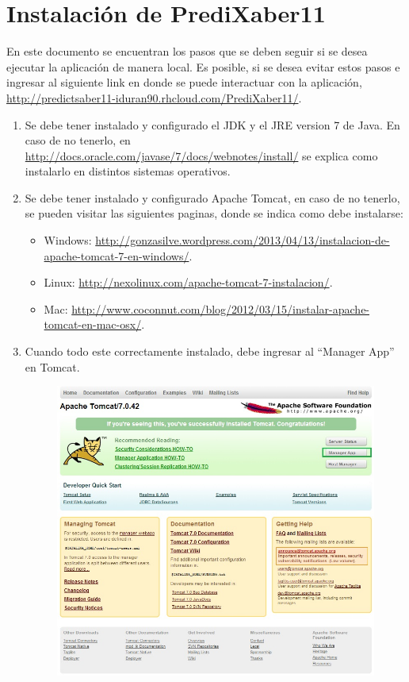 \documentclass{article}
\begin{document}
\sloppy
\section*{Instalación de PrediXaber11}
En este documento se encuentran los pasos que se deben seguir si se desea ejecutar la aplicación de manera local. Es posible, si se desea evitar estos pasos e ingresar al siguiente link en donde se puede interactuar con la aplicación, \url{http://predictsaber11-iduran90.rhcloud.com/PrediXaber11/}.
\begin{enumerate}
\item Se debe tener instalado y configurado el JDK y el JRE version 7 de Java. En caso de no tenerlo, en \url{http://docs.oracle.com/javase/7/docs/webnotes/install/} se explica como instalarlo en distintos sistemas operativos.
\item Se debe tener instalado y configurado Apache Tomcat, en caso de no tenerlo, se pueden visitar las siguientes paginas, donde se indica como debe instalarse:
\begin{itemize}
\item Windows: \url{http://gonzasilve.wordpress.com/2013/04/13/instalacion-de-apache-tomcat-7-en-windows/}.
\item Linux: \url{http://nexolinux.com/apache-tomcat-7-instalacion/}.
\item Mac: \url{http://www.coconnut.com/blog/2012/03/15/instalar-apache-tomcat-en-mac-osx/}.
\end{itemize}
\item Cuando todo este correctamente instalado, debe ingresar al ``Manager App'' en Tomcat.
\begin{figure}[H]
\begin{centering}
\includegraphics[scale=0.5]{tomcat6}

\end{centering}
\end{figure}
\end{enumerate}
\end{document}

